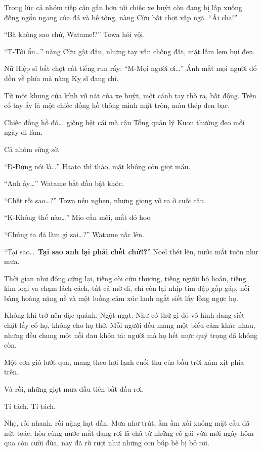 \documentclass[../main.tex]{subfiles}
\begin{document}
Trong lúc cả nhóm tiếp cận gần hơn tới chiếc xe buýt còn đang bị lấp xuống đống ngổn ngang của đá và bê tông, nàng Cừu bất chợt vấp ngã. ``Ái cha!''

``Bà không sao chứ, Watame!?'' Towa hỏi vội.

``T-Tôi ổn\dots'' nàng Cừu gật đầu, nhưng tay vẫn chống đất, mặt lấm lem bụi đen.

Nữ Hiệp sĩ bất chợt cất tiếng run rẩy: ``M-Mọi người ơi\dots'' Ánh mắt mọi người đổ dồn về phía mà nàng Kỵ sĩ đang chỉ.

Từ một khung cửa kính vỡ nát của xe buýt, một cánh tay thò ra, bất động. Trên cổ tay ấy là một chiếc đồng hồ thông minh mặt tròn, màu thép đen bạc.

Chiếc đồng hồ đó\dots\ giống hệt cái mà cậu Tổng quản lý Kuon thường đeo mỗi ngày đi làm.

Cả nhóm sững sờ.

``Đ-Đừng nói là\dots'' Haato thì thào, mặt không còn giọt máu.

``Anh ấy\dots'' Watame bắt đầu bật khóc.

``Chết rồi sao\dots?'' Towa nén nghẹn, nhưng giọng vỡ ra ở cuối câu.

``K-Không thể nào\dots'' Mio cắn môi, mắt đỏ hoe.

``Chúng ta đã làm gì sai\dots?'' Watame nấc lên.

``Tại sao\dots\ \textbf{Tại sao anh lại phải chết chứ!?}'' Noel thét lên, nước mắt tuôn như mưa.

Thời gian như đông cứng lại, tiếng còi cứu thương, tiếng người hô hoán, tiếng kim loại va chạm lách cách, tất cả mờ đi, chỉ còn lại nhịp tim đập gấp gáp, nỗi bàng hoàng nặng nề và một luồng cảm xúc lạnh ngắt siết lấy lồng ngực họ.

Không khí trở nên đặc quánh. Ngột ngạt. Như có thứ gì đó vô hình đang siết chặt lấy cổ họ, không cho họ thở. Mỗi người đều mang một biểu cảm khác nhau, nhưng đều chung một nỗi đau khôn tả: người mà họ hết mực quý trọng đã không còn.

Một cơn gió lướt qua, mang theo hơi lạnh cuối thu của bầu trời xám xịt phía trên.

Và rồi, những giọt mưa đầu tiên bắt đầu rơi.

Tí tách. Tí tách.

Nhẹ, rồi nhanh, rồi nặng hạt dần. Mưa như trút, ầm ầm xối xuống mặt cầu đã nứt toác, hòa cùng nước mắt đang rơi lã chã từ những cô gái vừa mới ngày hôm qua còn cười đùa, nay đã rũ rượi như những con búp bê bị bỏ rơi.
\end{document}
